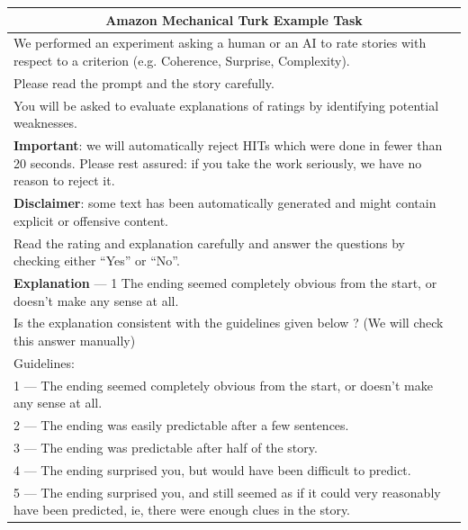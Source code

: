 \begin{longtable}[h]{p{}}
\label{tab:amt_user_study_instructions}\\
\toprule
\multicolumn{1}{c}{\Large Amazon Mechanical Turk Example Task}\\
\midrule
We performed an experiment asking a human or an AI to rate stories with respect to a criterion (e.g. Coherence, Surprise, Complexity).\\
Please read the prompt and the story carefully.\\
You will be asked to evaluate explanations of ratings by identifying potential weaknesses.\\
\textbf{Important}: we will automatically reject HITs which were done in fewer than 20 seconds. Please rest assured: if you take the work seriously, we have no reason to reject it.\\
\textbf{Disclaimer}: some text has been automatically generated and might contain explicit or offensive content.\\
Read the rating and explanation carefully and answer the questions by checking either ``Yes'' or ``No''.\\
\midrule
\textbf{Explanation} --- 1 The ending seemed completely obvious from the start, or doesn’t make any sense at all.\\
\midrule
Is the explanation consistent with the guidelines given below ? (We will check this answer manually)\\
Guidelines:\\
1 — The ending seemed completely obvious from the start, or doesn't make any sense at all.\\
2 — The ending was easily predictable after a few sentences.\\
3 — The ending was predictable after half of the story.\\
4 — The ending surprised you, but would have been difficult to predict.\\
5 — The ending surprised you, and still seemed as if it could very reasonably have been predicted, ie, there were enough clues in the story.\\


\end{longtable}
